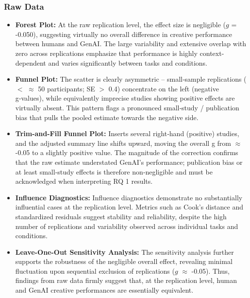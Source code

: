 \documentclass[manuscript, screen, review, acmsmall, anonymous]{acmart}
\begin{document}
\subsubsection{Raw Data}
\begin{itemize}
  \item \textbf{Forest Plot:} At the raw replication level, the effect size is negligible ($g$ = -0.050), suggesting virtually no overall difference in creative performance between humans and GenAI. The large variability and extensive overlap with zero across replications emphasize that performance is highly context-dependent and varies significantly between tasks and conditions.
  \item \textbf{Funnel Plot:}  The scatter is clearly asymmetric – small‑sample replications ($<$ $\approx$ 50 participants; SE $>$ 0.4) concentrate on the left (negative g‑values), while equivalently imprecise studies showing positive effects are virtually absent. This pattern flags a pronounced small‑study / publication bias that pulls the pooled estimate towards the negative side.
  \item \textbf{Trim-and-Fill Funnel Plot:} Inserts several right‑hand (positive) studies, and the adjusted summary line shifts upward, moving the overall g from $\approx$ -0.05 to a slightly positive value. The magnitude of the correction confirms that the raw estimate understated GenAI’s performance; publication bias or at least small‑study effects is therefore non‑negligible and must be acknowledged when interpreting RQ 1 results.
  \item \textbf{Influence Diagnostics:} Influence diagnostics demonstrate no substantially influential cases at the replication level. Metrics such as Cook’s distance and standardized residuals suggest stability and reliability, despite the high number of replications and variability observed across individual tasks and conditions.
  \item \textbf{Leave-One-Out Sensitivity Analysis:} The sensitivity analysis further supports the robustness of the negligible overall effect, revealing minimal fluctuation upon sequential exclusion of replications ($g$ $\approx$ -0.05). Thus, findings from raw data firmly suggest that, at the replication level, human and GenAI creative performances are essentially equivalent.
\end{itemize}
\end{document}
